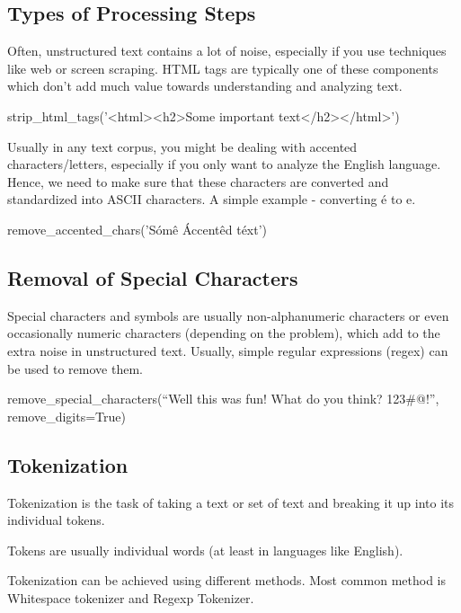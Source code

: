 	\subsection{Types of Processing Steps}
	\begin{bulletedlist}
		\item Often, unstructured text contains a lot of noise, especially if you use techniques like web or screen scraping. HTML tags are typically one of these components which don't add much value towards understanding and analyzing text.
		\begin{bulletedlist}
			\item strip\_html\_tags('<html><h2>Some important text</h2></html>')
		\end{bulletedlist}
		\item Usually in any text corpus, you might be dealing with accented characters/letters, especially if you only want to analyze the English language.  Hence, we need to make sure that these characters are converted and standardized into ASCII characters.
A simple example - converting \'{e} to e.
		\begin{bulletedlist}
			\item remove\_accented\_chars('S\'{o}m\^{e} \'{A}ccent\^{e}d t\'{e}xt')
		\end{bulletedlist}
	\end{bulletedlist}

	\subsection{Removal of Special Characters}
	\begin{bulletedlist}
		\item Special characters and symbols are usually non-alphanumeric characters or even occasionally numeric characters (depending on the problem), which add to the extra noise in unstructured text.  Usually, simple regular expressions (regex) can be used to remove them.
		\begin{bulletedlist}
			\item remove\_special\_characters(``Well this was fun! What do you think? 123\#@!'', remove\_digits=True)
		\end{bulletedlist}
	\end{bulletedlist}

	\subsection{Tokenization}
	\begin{bulletedlist}
		\item Tokenization is the task of taking a text or set of text and breaking it up into its individual tokens.
		\item Tokens are usually individual words (at least in languages like English).
		\item Tokenization can be achieved using different methods. Most common method is Whitespace tokenizer and Regexp Tokenizer.
	\end{bulletedlist}

